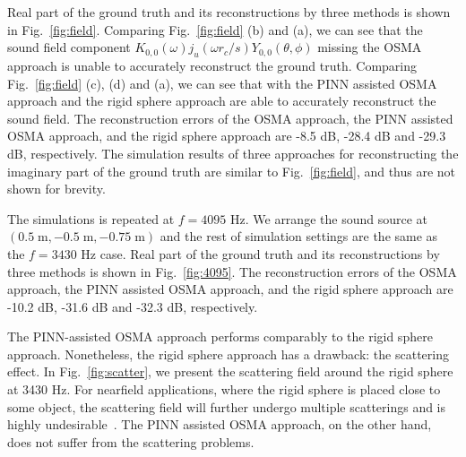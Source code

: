 \documentclass[11pt]{article}
\begin{document}
Real part of the ground truth and its reconstructions 
by three methods is shown in Fig.~\ref{fig:field}. 
Comparing Fig.~\ref{fig:field} (b) and (a), we can see that  the sound field 
component $K_{0,0}(\omega)j_u(\omega{r_c}/s)Y_{0,0}(\theta,\phi)$ missing the OSMA approach is unable to 
accurately reconstruct the ground truth. 
Comparing Fig.~\ref{fig:field} (c), (d) and (a), we can see that with 
the PINN assisted OSMA approach and the rigid sphere approach 
are able to accurately reconstruct the sound field. 
The reconstruction errors of the OSMA approach, the PINN assisted OSMA approach, 
and the rigid sphere approach are -8.5 dB, -28.4 dB and -29.3 dB, respectively. 
The simulation results of three approaches for reconstructing the imaginary part 
of the ground truth are similar to Fig.~\ref{fig:field}, and thus are not shown for brevity.

The simulations is repeated at $f=4095$ Hz. We arrange the sound source at $(0.5\; \mathrm{m}, -0.5\;\mathrm{m}, -0.75\;\mathrm{m})$ 
and the rest of simulation settings are the same as the $f=3430$ Hz case.     
Real part of the ground truth and its reconstructions 
by three methods is shown in Fig.~\ref{fig:4095}. 
The reconstruction errors of the OSMA approach, the PINN assisted OSMA approach, 
and the rigid sphere approach are -10.2 dB, -31.6 dB and -32.3 dB, respectively. 



The PINN-assisted OSMA approach performs comparably to the rigid sphere approach.
Nonetheless, the rigid sphere approach has a drawback: the scattering effect. 
In Fig.~\ref{fig:scatter}, we present the scattering field around the rigid 
sphere at 3430 Hz. For nearfield applications, where the rigid sphere is placed 
close to some object, the scattering field will further undergo multiple scatterings 
and is highly undesirable~\cite{colton1998inverse}. 
The PINN assisted OSMA approach, on the other hand, does not suffer from the scattering problems. 
\end{document}
